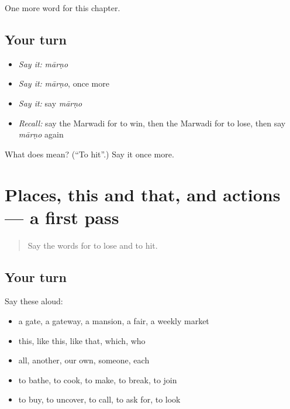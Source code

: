 \begin{grammarlens}[title={What you've built}]
One more word for this chapter.
\end{grammarlens}

\subsection*{Your turn}
\begin{itemize}
\raggedright
  \item \emph{Say it:} \emph{mārṇo}
  \item \emph{Say it:} \emph{mārṇo}, once more
  \item \emph{Say it:} say \emph{mārṇo}
  \item \emph{Recall:} say the Marwadi for to win, then the Marwadi for to lose, then say \emph{mārṇo} again
\end{itemize}

\begin{tcolorbox}[breakable,colback=teal!4,colframe=teal!35!black,title={Before you move on}]
What does  mean? (\textquotedblleft{}To hit\textquotedblright{}.) Say it once more.
\end{tcolorbox}
\section[(dialogue)]{Places, this and that, and actions — a first pass}

\label{lesson:MW-R109-first-pass-places-this-and-that-and-actions}



\begin{quote}
Say the words for to lose and to hit.
\end{quote}

\subsection*{Your turn}
Say these aloud:

\begin{itemize}
\raggedright
  \item a gate, a gateway, a mansion, a fair, a weekly market
  \item this, like this, like that, which, who
  \item all, another, our own, someone, each
  \item to bathe, to cook, to make, to break, to join
  \item to buy, to uncover, to call, to ask for, to look
\end{itemize}

